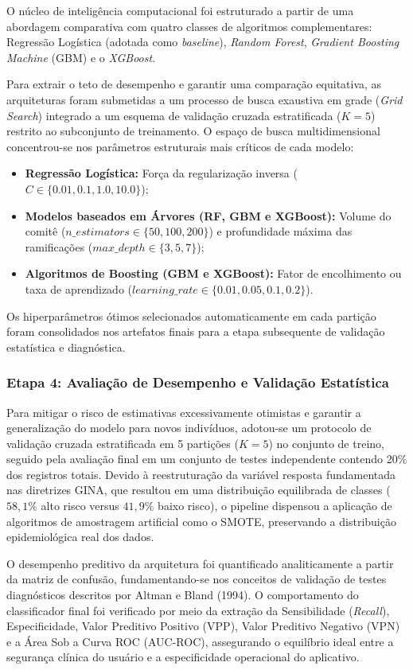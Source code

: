 \documentclass[12pt]{article}
\begin{document}
O núcleo de inteligência computacional foi estruturado a partir de uma abordagem comparativa com quatro classes de algoritmos complementares: Regressão Logística (adotada como \textit{baseline}), \textit{Random Forest}, \textit{Gradient Boosting Machine} (GBM) e o \textit{XGBoost}. 

Para extrair o teto de desempenho e garantir uma comparação equitativa, as arquiteturas foram submetidas a um processo de busca exaustiva em grade (\textit{Grid Search}) integrado a um esquema de validação cruzada estratificada ($K=5$) restrito ao subconjunto de treinamento. O espaço de busca multidimensional concentrou-se nos parâmetros estruturais mais críticos de cada modelo:
\begin{itemize}
    \item \textbf{Regressão Logística:} Força da regularização inversa ($C \in \{0.01, 0.1, 1.0, 10.0\}$);
    \item \textbf{Modelos baseados em Árvores (RF, GBM e XGBoost):} Volume do comitê ($n\_estimators \in \{50, 100, 200\}$) e profundidade máxima das ramificações ($max\_depth \in \{3, 5, 7\}$);
    \item \textbf{Algoritmos de Boosting (GBM e XGBoost):} Fator de encolhimento ou taxa de aprendizado ($learning\_rate \in \{0.01, 0.05, 0.1, 0.2\}$).
\end{itemize}

Os hiperparâmetros ótimos selecionados automaticamente em cada partição foram consolidados nos artefatos finais para a etapa subsequente de validação estatística e diagnóstica.

\subsubsection{Etapa 4: Avaliação de Desempenho e Validação Estatística}
Para mitigar o risco de estimativas excessivamente otimistas e garantir a generalização do modelo para novos indivíduos, adotou-se um protocolo de validação cruzada estratificada em 5 partições ($K=5$) no conjunto de treino, seguido pela avaliação final em um conjunto de testes independente contendo 20\% dos registros totais. Devido à reestruturação da variável resposta fundamentada nas diretrizes GINA, que resultou em uma distribuição equilibrada de classes ($58,1\%$ alto risco versus $41,9\%$ baixo risco), o pipeline dispensou a aplicação de algoritmos de amostragem artificial como o SMOTE, preservando a distribuição epidemiológica real dos dados.

O desempenho preditivo da arquitetura foi quantificado analiticamente a partir da matriz de confusão, fundamentando-se nos conceitos de validação de testes diagnósticos descritos por Altman e Bland (1994). O comportamento do classificador final foi verificado por meio da extração da Sensibilidade (\textit{Recall}), Especificidade, Valor Preditivo Positivo (VPP), Valor Preditivo Negativo (VPN) e a Área Sob a Curva ROC (AUC-ROC), assegurando o equilíbrio ideal entre a segurança clínica do usuário e a especificidade operacional do aplicativo.
\end{document}
